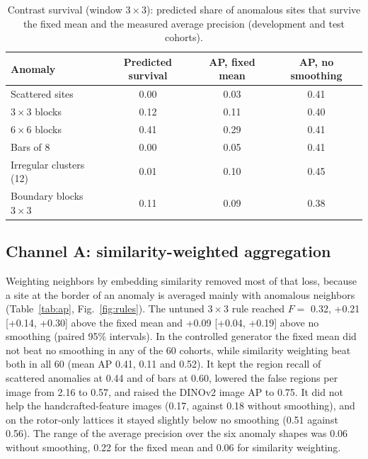 \documentclass[final,5p,times,twocolumn,authoryear]{elsarticle}
\begin{document}
\begin{table}[t]
\caption{Contrast survival (window $3\times3$): predicted share of anomalous sites that survive the fixed mean and the measured average precision (development and test cohorts).}
\label{tab:cs}
\centering\footnotesize\setlength{\tabcolsep}{4pt}
\begin{tabular}{lccc}
\toprule
Anomaly & Predicted survival & AP, fixed mean & AP, no smoothing\\
\midrule
Scattered sites & 0.00 & 0.03 & 0.41 \\
$3\times3$ blocks & 0.12 & 0.11 & 0.40 \\
$6\times6$ blocks & 0.41 & 0.29 & 0.41 \\
Bars of 8 & 0.00 & 0.05 & 0.41 \\
Irregular clusters (12) & 0.01 & 0.10 & 0.45 \\
Boundary blocks $3\times3$ & 0.11 & 0.09 & 0.38 \\
\bottomrule
\end{tabular}
\end{table}

\subsection{Channel A: similarity-weighted aggregation}
Weighting neighbors by embedding similarity removed most of that loss, because a site at the border of an anomaly is averaged mainly with anomalous neighbors (Table~\ref{tab:ap}, Fig.~\ref{fig:rules}). The untuned $3\times3$ rule reached $F=$ 0.32, +0.21 [+0.14, +0.30] above the fixed mean and +0.09 [+0.04, +0.19] above no smoothing (paired 95\% intervals). In the controlled generator the fixed mean did not beat no smoothing in any of the 60 cohorts, while similarity weighting beat both in all 60 (mean AP 0.41, 0.11 and 0.52). It kept the region recall of scattered anomalies at 0.44 and of bars at 0.60, lowered the false regions per image from 2.16 to 0.57, and raised the DINOv2 image AP to 0.75. It did not help the handcrafted-feature images (0.17, against 0.18 without smoothing), and on the rotor-only lattices it stayed slightly below no smoothing (0.51 against 0.56). The range of the average precision over the six anomaly shapes was 0.06 without smoothing, 0.22 for the fixed mean and 0.06 for similarity weighting.
\end{document}
